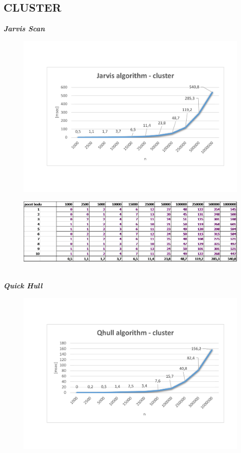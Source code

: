 \documentclass{article}
\begin{document}
\subsection{CLUSTER}
\textit{\textbf {Jarvis Scan}}
\\
\begin{figure}[htbp]
\centering
        \includegraphics[clip, trim=0cm 0cm 0cm 0cm, width=1\textwidth]{jc.pdf}
\end{figure}
\begin{figure}[htbp]
\centering
        \includegraphics[clip, trim=0cm 0cm 0cm 0cm, width=1\textwidth]{jc.png}
\end{figure}
\\
\clearpage
\newpage
\textit{\textbf {Quick Hull}}
\\
\begin{figure}[htbp]
\centering
        \includegraphics[clip, trim=0cm 0cm 0cm 0cm, width=1\textwidth]{qc.pdf}
\end{figure}
\end{document}
